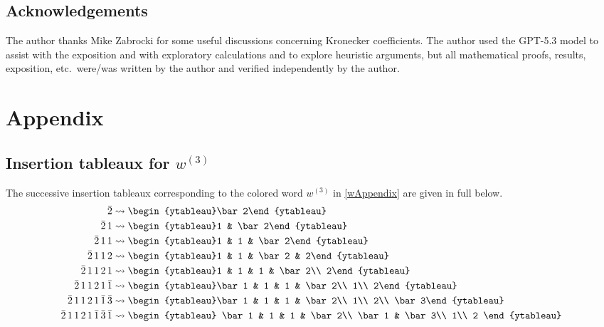 \documentclass[12pt]{article}
\begin{document}
\subsection*{Acknowledgements}
 The author thanks Mike Zabrocki for some useful discussions concerning Kronecker coefficients. The author used the GPT-5.3 model to 
 assist with the exposition and with exploratory calculations and to explore heuristic arguments, but 
 all mathematical proofs, results, exposition, etc.\ were/was written by the author and verified independently by the author.

\section{Appendix} 

\subsection{Insertion tableaux for $w^{(3)}$}\label{AppendInsert}
 The successive insertion tableaux corresponding to the colored word $w^{(3)}$ in \eqref{wAppendix} are given in full below. 
\begin{align*}
 \bar2 & \rightsquigarrow \begin{ytableau}\bar2\end{ytableau} \\ 
 \bar2\,1 & \rightsquigarrow \begin{ytableau}1 & \bar2\end{ytableau} \\ 
 \bar2\,1\,1 & \rightsquigarrow \begin{ytableau}1 & 1 & \bar2\end{ytableau} \\ 
 \bar2\,1\,1\,2 & \rightsquigarrow \begin{ytableau}1 & 1 & \bar2 & 2\end{ytableau} \\ 
 \bar2\,1\,1\,2\,1 & \rightsquigarrow \begin{ytableau}1 & 1 & 1 & \bar2\\ 2\end{ytableau} \\ 
 \bar2\,1\,1\,2\,1\,\bar1 & \rightsquigarrow \begin{ytableau}\bar1 & 1 & 1 & \bar2\\ 1\\ 2\end{ytableau} \\ 
 \bar2\,1\,1\,2\,1\,\bar1\,\bar3 & \rightsquigarrow \begin{ytableau}\bar1 & 1 & 1 & \bar2\\ 1\\ 2\\ \bar3\end{ytableau} \\ 
 \bar2\,1\,1\,2\,1\,\bar1\,\bar3\,\bar1 & \rightsquigarrow \begin{ytableau} \bar1 & 1 & 1 & \bar2\\ \bar1 & \bar3\\ 1\\ 2 \end{ytableau} 
\end{align*}
\end{document}
